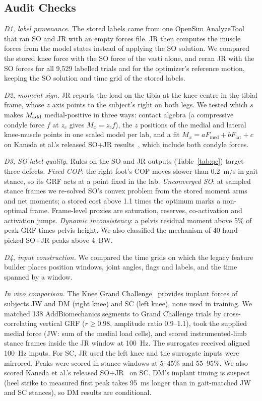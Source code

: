 \subsection{Audit Checks}\label{sec:audit}
\textit{D1, label provenance.} The stored labels came from one OpenSim AnalyzeTool that ran SO
and JR with an empty forces file. JR then computes the muscle forces from the model states
instead of applying the SO solution. We compared the stored knee force with the SO force of the
vasti alone, and reran JR with the SO forces for all 9,529 labelled trials and for the
optimizer's reference motion, keeping the SO solution and time grid of the stored labels.

\textit{D2, moment sign.} JR reports the load on the tibia at the knee centre in the tibial
frame, whose $z$ axis points to the subject's right on both legs. We tested which $s$ makes
$M_{\mathrm{add}}$ medial-positive in three ways: contact algebra (a compressive condyle force $f$ at
$z_c$ gives $M_x = z_c f$), the $z$ positions of the medial and lateral knee-muscle points in one
scaled model per lab, and a fit $M_x = aF_{\mathrm{med}} + bF_{\mathrm{lat}} + c$ on Kaneda et al.'s
released SO+JR results~\cite{kaneda2023}, which include both condyle forces.

\textit{D3, SO label quality.} Rules on the SO and JR outputs (Table~\ref{tab:qc}) target three
defects. \emph{Fixed COP}: the right foot's COP moves slower than 0.2~m/s in gait stance, so its
GRF acts at a point fixed in the lab. \emph{Unconverged SO}: at sampled stance frames we re-solved
SO's convex problem from the stored moment arms and net moments; a stored cost above 1.1 times
the optimum marks a non-optimal frame. Frame-level proxies are saturation, reserves,
co-activation and activation jumps. \emph{Dynamic inconsistency}: a pelvis residual moment above
5\% of peak GRF times pelvis height. We also classified the mechanism of 40 hand-picked SO+JR
peaks above 4~BW.

\textit{D4, input construction.} We compared the time grids on which the legacy feature builder
places position windows, joint angles, flags and labels, and the time spanned by a window.

\textit{In vivo comparison.} The Knee Grand Challenge~\cite{fregly2012} provides implant forces
of subjects JW and DM (right knee) and SC (left knee), none used in training.
We matched 138 AddBiomechanics segments to Grand Challenge trials by cross-correlating vertical
GRF ($r \ge 0.98$, amplitude ratio 0.9--1.1), took the supplied medial force (JW: sum of the
medial load cells), and scored instrumented-limb stance frames inside the JR window at 100~Hz.
The surrogates received aligned 100~Hz inputs. For
SC, JR used the left knee and the surrogate inputs were mirrored. Peaks were scored in stance
windows at 5--45\% and 55--95\%. We also scored Kaneda et al.'s released
SO+JR~\cite{kaneda2023} on SC. DM's implant timing is
suspect (heel strike to measured first peak takes 95~ms longer than in gait-matched JW and SC
stances), so DM results are conditional.


